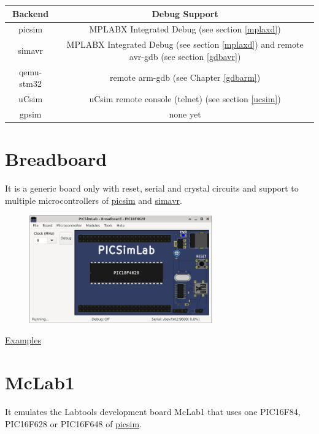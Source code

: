 \begin{center}
\begin{tabular}{c|c}
\hline \textbf{Backend} & \textbf{Debug Support}\\
\hline picsim & MPLABX Integrated Debug (see section \ref{mplaxd})\\
\hline simavr & MPLABX Integrated Debug (see section \ref{mplaxd}) and remote avr-gdb (see section \ref{gdbavr})\\
\hline qemu-stm32 & remote arm-gdb (see Chapter \ref{gdbarm})\\
\hline uCsim & uCsim remote console (telnet) (see section \ref{ucsim})\\
\hline gpsim & none yet\\
\hline 
\end{tabular}
\end{center}



\section{Breadboard}

It is a generic board only with reset, serial and crystal circuits and support to multiple microcontrollers 
of \href{https://github.com/lcgamboa/picsim}{picsim} and \href{https://github.com/buserror/simavr}{simavr}.

\begin{figure}[H]
\center
\includegraphics[width=0.7\textwidth]{img/picsimlab0.png} 
\end{figure} 

\href{https://lcgamboa.github.io/picsimlab_examples/board_Breadboard.html}{Examples}

\section{McLab1}

It emulates the Labtools development board McLab1 that uses one PIC16F84, PIC16F628 or PIC16F648 of \href{https://github.com/lcgamboa/picsim}{picsim}.


